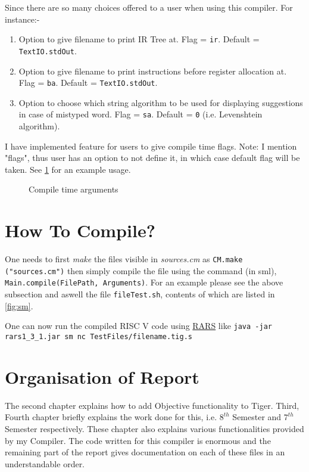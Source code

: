 Since there are so many choices offered to a user when using this compiler. For instance:-

\begin{enumerate}
	\item Option to give filename to print IR Tree at. Flag = \texttt{ir}. Default = \texttt{TextIO.stdOut}.
	\item Option to give filename to print instructions before register allocation at. Flag = \texttt{ba}. Default = \texttt{TextIO.stdOut}.
	\item Option to choose which string algorithm to be used for displaying suggestions in case of mistyped word. Flag = \texttt{sa}. Default = \texttt{0} (i.e. Levenshtein algorithm).
\end{enumerate}

I have implemented feature for users to give compile time flags. Note: I mention "flags", thus user has an option to not define it, in which case default flag will be taken. See \ref{fig:flags} for an example usage.


\begin{figure}
	\centering
	\caption{Compile time arguments}
	\label{fig:flags}
\end{figure}

\section{How To Compile?}

One needs to first \textit{make} the files visible in \textit{sources.cm} as \texttt{CM.make ("sources.cm")} then simply compile the file using the command (in sml), \texttt{Main.compile(FilePath, Arguments)}. For an example please see the above subsection and aswell the file \texttt{fileTest.sh}, contents of which are listed in \ref{fig:sm}.

One can now run the compiled RISC V code using \href{https://github.com/TheThirdOne/rars}{RARS} like \texttt{java -jar rars1\_3\_1.jar sm nc TestFiles/filename.tig.s}

\section{Organisation of Report}

The second chapter explains how to add Objective functionality to Tiger. Third, Fourth chapter briefly explains the work done for this, i.e. $8^{th}$ Semester and $7^{th}$ Semester respectively. These chapter also explains various functionalities provided by my Compiler. The code written for this compiler is enormous and the remaining part of the report gives documentation on each of these files in an understandable order.